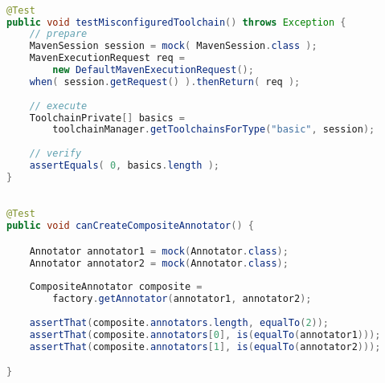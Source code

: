 \begin{lstlisting}[basicstyle=\ttfamily, caption={This code snippet illustrates an example from maven-core, where both the focal method, and a method invocation on a mocked object are both presented in the unit test case \textit{testMisconfiguredToolchain()}},
basicstyle=\scriptsize\ttfamily,language = Java, framesep=4.5mm,
framexleftmargin=1.0mm, captionpos=b, xleftmargin=3.5ex, label=lis:mockCall]

@Test
public void testMisconfiguredToolchain() throws Exception {
	// prepare
	MavenSession session = mock( MavenSession.class );
	MavenExecutionRequest req = 
		new DefaultMavenExecutionRequest();
	when( session.getRequest() ).thenReturn( req );
	
	// execute
	ToolchainPrivate[] basics =
	 	toolchainManager.getToolchainsForType("basic", session);
	
	// verify
	assertEquals( 0, basics.length );
}

\end{lstlisting}

\begin{lstlisting}[basicstyle=\ttfamily, caption={This example illustrates an array container holding mock objects from test case \textit{canCreateCompositeAnnotator()}.},
basicstyle=\scriptsize\ttfamily,language = Java, framesep=4.5mm,
framexleftmargin=1mm, captionpos=b, xleftmargin=3.5ex, label=lis:container]

@Test
public void canCreateCompositeAnnotator() {

	Annotator annotator1 = mock(Annotator.class);
	Annotator annotator2 = mock(Annotator.class);
	
	CompositeAnnotator composite = 
		factory.getAnnotator(annotator1, annotator2);
	
	assertThat(composite.annotators.length, equalTo(2));
	assertThat(composite.annotators[0], is(equalTo(annotator1)));
	assertThat(composite.annotators[1], is(equalTo(annotator2)));

}

\end{lstlisting}
